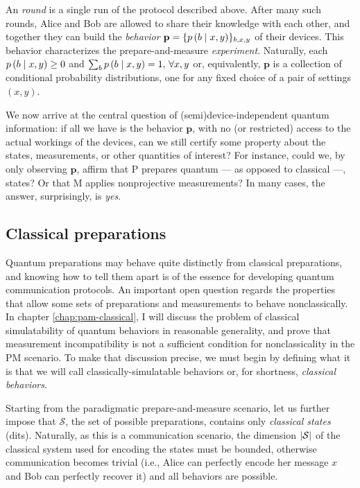         An \emph{round} is a single run of the protocol described above. After many such rounds, Alice and Bob are allowed to share their knowledge with each other, and together they can build the \emph{behavior} $\mathbf{p} = \{ p \left( b \mid x,y \right) \}_{b,x,y}$ of their devices. This behavior characterizes the prepare-and-measure \emph{experiment}. Naturally, each $p \left( b \mid x,y \right) \geq 0$ and $\sum_b p \left( b \mid x,y \right) = 1, \,\forall x,y$ or, equivalently, $\mathbf{p}$ is a collection of conditional probability distributions, one for any fixed choice of a pair of settings $(x,y)$.
        
        We now arrive at the central question of (semi)device-independent quantum information: if all we have is the behavior $\mathbf{p}$, with no (or restricted) access to the actual workings of the devices, can we still certify some property about the states, measurements, or other quantities of interest? For instance, could we, by only observing $\mathbf{p}$, affirm that P prepares quantum --- as opposed to classical ---, states? Or that M applies nonprojective measurements? In many cases, the answer, surprisingly, is \emph{yes}.
    
        \subsection{Classical preparations}
        \label{sec:classical-behaviors}

            Quantum preparations may behave quite distinctly from classical preparations, and knowing how to tell them apart is of the essence for developing quantum communication protocols. An important open question regards the properties that allow some sets of preparations and measurements to behave nonclassically. In chapter \ref{chap:pam-classical}, I will discuss the problem of classical simulatability of quantum behaviors in reasonable generality, and prove that measurement incompatibility is not a sufficient condition for nonclassicality in the PM scenario. To make that discussion precise, we must begin by defining what it is that we will call classically-simulatable behaviors or, for shortness, \emph{classical behaviors}.
        
            Starting from the paradigmatic prepare-and-measure scenario, let us further impose that $\mathcal{S}$, the set of possible preparations, contains only \emph{classical states} (dits). Naturally, as this is a communication scenario, the dimension $\abs{\mathcal{S}}$ of the classical system used for encoding the states must be bounded, otherwise communication becomes trivial (i.e., Alice can perfectly encode her message $x$ and Bob can perfectly recover it) and all behaviors are possible.
            
